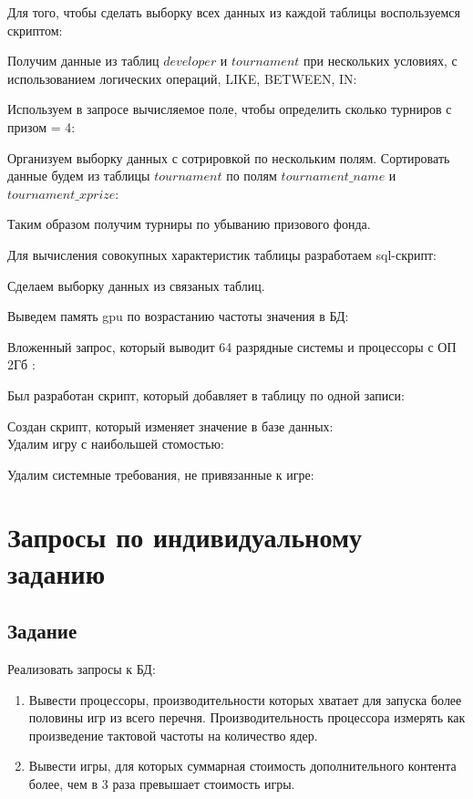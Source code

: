 \documentclass[a4paper,14pt]{extarticle}
\begin{document}
Для того, чтобы сделать выборку всех данных из каждой таблицы воспользуемся скриптом:


Получим данные из таблиц $developer$ и $tournament$ при нескольких условиях, с использованием логических операций, LIKE, BETWEEN, IN:


Используем в запросе вычисляемое поле, чтобы определить сколько турниров с призом = 4:


Организуем выборку данных с сотрировкой по нескольким полям.
Сортировать данные будем из таблицы $tournament$ по полям $tournament\_name$ и $tournament\_xprize$:

Таким образом получим турниры по убыванию призового фонда.

Для вычисления совокупных характеристик таблицы разработаем sql-скрипт:


Сделаем выборку данных из связаных таблиц.


Выведем память gpu по возрастанию частоты значения в БД:


Вложенный запрос, который выводит 64 разрядные системы и процессоры с ОП 2Гб :


Был разработан скрипт, который добавляет в таблицу по одной записи: 


Создан скрипт, который изменяет значение в базе данных:\\ 


Удалим игру с наибольшей стомостью:


Удалим системные требования, не привязанные к игре:


\section{Запросы по индивидуальному заданию}
\subsection{Задание}
Реализовать запросы к БД:

\begin{enumerate}
\item Вывести процессоры, производительности которых хватает для запуска более половины игр из всего перечня. Производительность процессора измерять как произведение тактовой частоты на количество ядер.
\item Вывести игры, для которых суммарная стоимость дополнительного контента более, чем в 3 раза превышает стоимость игры.
\end{enumerate}
\end{document}
